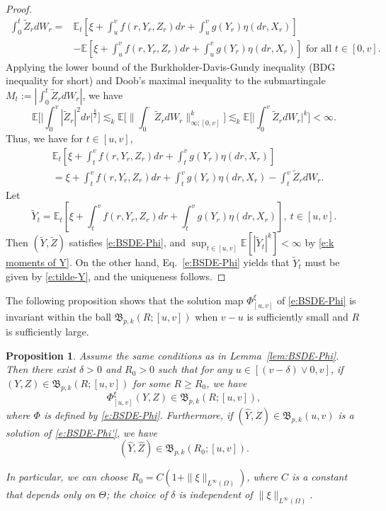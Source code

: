 \documentclass[11pt,reqno]{amsart}
\newtheorem{proposition}{Proposition}[section]
\numberwithin{equation}{section}
\begin{document}
\begin{proof}
\begin{align*}
\int_0^t \tilde{Z}_{r} dW_r =& \mathbb{E}_{t}\left[\xi + \int_{u}^{v}f(r,Y_{r},Z_{r})dr + \int_{u}^{v}g(Y_{r})\eta(dr,X_{r})\right]\\
&- \mathbb{E}\left[\xi + \int_{u}^{v}f(r,Y_{r},Z_{r})dr + \int_{u}^{v}g(Y_{r})\eta(dr,X_{r})\right]\text{ for all }t\in[0, v].
\end{align*}
Applying the lower bound of the Burkholder-Davis-Gundy inequality (BDG inequality for short) and Doob's maximal inequality to the submartingale $M_t:=|\int_{0}^{t}\tilde{Z}_r dW_r|$, we have
\[\mathbb{E}\bigg[\Big|\int_{0}^{v}|\tilde{Z}_{r}|^{2}dr\Big|^{\frac{k}{2}}\bigg]\lesssim_{k}\mathbb{E}\bigg[\Big\|\int_{0}^{\cdot}\tilde{Z}_r dW_{r}\Big\|_{\infty;[0,v]}^{k}\bigg]\lesssim_k \mathbb{E}\bigg[\Big|\int_{0}^{v}\tilde{Z}_r dW_{r}\Big|^{k}\bigg]<\infty.\]
Thus, we have for $t\in[u,v]$,
\begin{align*}
&\mathbb{E}_{t}\left[\xi + \int_{t}^{v}f(r,Y_{r},Z_{r}) dr + \int_{t}^{v} g(Y_{r})\eta(dr,X_{r})\right]\\
& = \xi + \int_{t}^{v}f(r,Y_{r},Z_{r}) dr + \int_{t}^{v} g(Y_{r})\eta(dr,X_{r}) -\int_{t}^{v}\tilde{Z}_{r}dW_{r}.
\end{align*}
Let 
\begin{equation}\label{e:tilde-Y}
\tilde{Y}_{t} = \mathbb{E}_{t}\left[\xi + \int_{t}^{v}f(r,Y_{r},Z_{r}) dr + \int_{t}^{v} g(Y_{r})\eta(dr,X_{r})\right],~ t\in[u,v].
\end{equation}
Then $(\tilde Y, \tilde Z)$ satisfies \eqref{e:BSDE-Phi}, and $\sup_{t\in[u,v]}\mathbb{E}[|\tilde{Y}_{t}|^{k}]<\infty$ by \eqref{e:k moments of Y}. On the other hand, Eq.~\eqref{e:BSDE-Phi} yields that $\tilde Y_t$ must be given by \eqref{e:tilde-Y}, and the uniqueness follows. 
\end{proof}


The following proposition shows that the solution map $\Phi^{\xi}_{[u,v]}$ of \eqref{e:BSDE-Phi} is invariant within the ball $\mathfrak B_{p,k}(R;  [u,v])$ when $v-u$ is sufficiently small and $R$ is sufficiently large.

\begin{proposition}\label{prop:ball-invariance} 
Assume the same conditions as in Lemma~\ref{lem:BSDE-Phi}. Then
there exist $\delta >0$ and $R_0>0$ such that for any $u\in [(v-\delta)\vee 0, v]$, if $(Y,Z)\in \mathfrak B_{p,k}(R;  [u,v])$ for some $R\ge R_0$,   we have
\[\Phi^{\xi}_{[u,v]}(Y,Z) \in\mathfrak B_{p,k}(R;[u,v]),\]
where $\Phi$ is defined by \eqref{e:BSDE-Phi}. Furthermore, if $(\widehat Y,\widehat Z)\in \mathfrak{B}_{p,k}(u,v)$ is a solution of \eqref{e:BSDE-Phi'}, we have 
\[(\widehat Y, \widehat Z)\in \mathfrak B_{p, k}(R_{0};[u,v]).\]

In particular, we can choose $R_0=C(1+\|\xi\|_{L^{\infty}(\Omega)})$, where $C$ is a constant that depends only on $
\Theta$; the choice of $\delta$ is independent of $\|\xi\|_{L^{\infty}(\Omega)}$.  		
\end{proposition}
\end{document}
